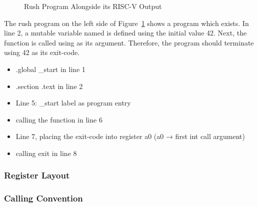 \noindent
\begin{figure}[h]
	\begin{minipage}{.4\textwidth}
	\end{minipage}%
	\begin{minipage}{.6\textwidth}
	\end{minipage}
	\caption{Rush Program Alongside its RISC-V Output}\label{fig:rush_riscv_split}
\end{figure}

The rush program on the left side of Figure~\ref{fig:rush_riscv_split} shows a program which exists.
In line 2, a mutable variable named  is defined using the initial value 42.
Next, the  function is called using  as its argument.
Therefore, the program should terminate using 42 as its exit-code.

\begin{itemize}
    \item .global \_start in line 1
    \item .section .text in line 2
    \item Line 5: \_start label as program entry
    \item calling the  function in line 6
    \item Line 7, placing the exit-code into register a0 (a0 → first int call argument)
    \item calling exit in line 8
\end{itemize}

\subsubsection{Register Layout}



\subsubsection{Calling Convention}

